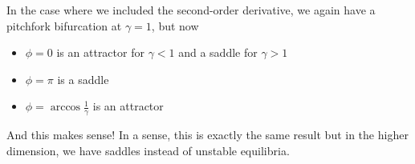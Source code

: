 \documentclass[12pt]{article}
\begin{document}
\begin{enumerate}[(i)]
          In the case where we included the second-order derivative, we again have a pitchfork bifurcation at $\gamma = 1$, but now
          \begin{itemize}
              \item $\phi = 0$ is an attractor for $\gamma < 1$ and a saddle for $\gamma > 1$
              \item $\phi = \pi$ is a saddle
              \item $\phi = \arccos \frac{1}{\gamma}$ is an attractor
          \end{itemize}

          And this makes sense! In a sense, this is exactly the same result but in the higher dimension, we have saddles instead of unstable equilibria.

\end{enumerate}

\end{document}
